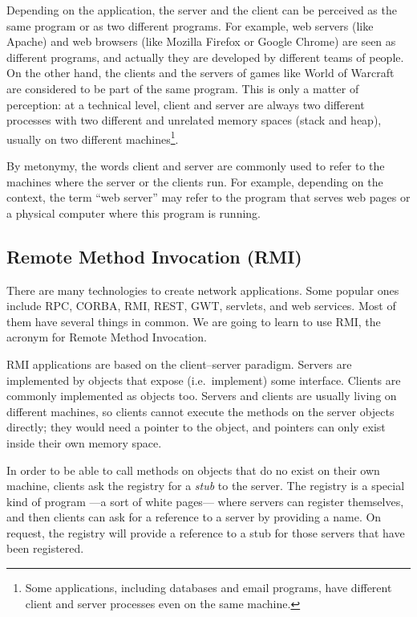Depending on the application, the server and the client can be
perceived as the same program or as two different programs. 
For example, web servers (like
Apache) and web browsers (like Mozilla Firefox or Google Chrome) are
seen as different programs, and actually they are developed by
different teams of people. On the other hand, the clients and the
servers of games like World of Warcraft are considered to be part of
the same program. This is only a matter of perception: at a technical
level, client and server are always two different processes with two
different and unrelated memory spaces (stack and heap), usually on two
different machines\footnote{Some applications, including databases and
email programs, have different client and server processes even on the
same machine.}. 

By metonymy, the words client and server are commonly used to refer to
the machines where the server or the clients run. For example,
depending on the context, the term ``web server'' may refer to the
program that serves web pages or a physical computer where this
program is running. 

\subsection{Remote Method Invocation (RMI)}
\label{sec:remote-meth-invoc}

There are many technologies to create network applications. Some 
popular ones include RPC, CORBA, RMI, REST, GWT, servlets, and web
services. Most of them have several things in common. We are going to
learn to use RMI, the acronym for Remote Method Invocation. 

RMI applications are based on the client--server paradigm. Servers are
implemented by objects that expose (i.e.~implement) some
interface. Clients are commonly implemented as objects too. Servers
and clients are usually living on different machines, so clients
cannot execute the methods on the server objects directly; they would
need a pointer to the object, and pointers can only exist inside their
own memory space. 

In order to be able to call methods on objects that do no exist on
their own machine, clients ask the registry for a \emph{stub} to the
server. The registry is a special kind of program ---a sort of white
pages--- where servers can register themselves, and then clients can
ask for a reference to a server by providing a name. 
On request, the registry will
provide a reference to a stub for those servers that have been registered. 

